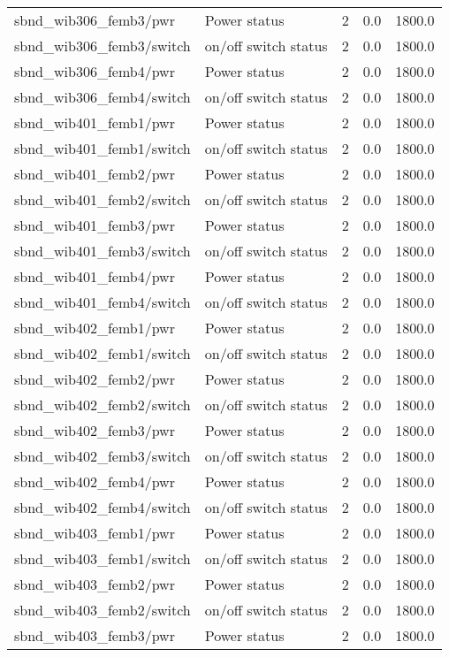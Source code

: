 \begin{center}
\begin{longtable}{l | l l l l }
sbnd\_wib306\_femb3/pwr & Power status & 2 & 0.0 & 1800.0\\ 
sbnd\_wib306\_femb3/switch & on/off switch status & 2 & 0.0 & 1800.0\\ 
sbnd\_wib306\_femb4/pwr & Power status & 2 & 0.0 & 1800.0\\ 
sbnd\_wib306\_femb4/switch & on/off switch status & 2 & 0.0 & 1800.0\\ 
sbnd\_wib401\_femb1/pwr & Power status & 2 & 0.0 & 1800.0\\ 
sbnd\_wib401\_femb1/switch & on/off switch status & 2 & 0.0 & 1800.0\\ 
sbnd\_wib401\_femb2/pwr & Power status & 2 & 0.0 & 1800.0\\ 
sbnd\_wib401\_femb2/switch & on/off switch status & 2 & 0.0 & 1800.0\\ 
sbnd\_wib401\_femb3/pwr & Power status & 2 & 0.0 & 1800.0\\ 
sbnd\_wib401\_femb3/switch & on/off switch status & 2 & 0.0 & 1800.0\\ 
sbnd\_wib401\_femb4/pwr & Power status & 2 & 0.0 & 1800.0\\ 
sbnd\_wib401\_femb4/switch & on/off switch status & 2 & 0.0 & 1800.0\\ 
sbnd\_wib402\_femb1/pwr & Power status & 2 & 0.0 & 1800.0\\ 
sbnd\_wib402\_femb1/switch & on/off switch status & 2 & 0.0 & 1800.0\\ 
sbnd\_wib402\_femb2/pwr & Power status & 2 & 0.0 & 1800.0\\ 
sbnd\_wib402\_femb2/switch & on/off switch status & 2 & 0.0 & 1800.0\\ 
sbnd\_wib402\_femb3/pwr & Power status & 2 & 0.0 & 1800.0\\ 
sbnd\_wib402\_femb3/switch & on/off switch status & 2 & 0.0 & 1800.0\\ 
sbnd\_wib402\_femb4/pwr & Power status & 2 & 0.0 & 1800.0\\ 
sbnd\_wib402\_femb4/switch & on/off switch status & 2 & 0.0 & 1800.0\\ 
sbnd\_wib403\_femb1/pwr & Power status & 2 & 0.0 & 1800.0\\ 
sbnd\_wib403\_femb1/switch & on/off switch status & 2 & 0.0 & 1800.0\\ 
sbnd\_wib403\_femb2/pwr & Power status & 2 & 0.0 & 1800.0\\ 
sbnd\_wib403\_femb2/switch & on/off switch status & 2 & 0.0 & 1800.0\\ 
sbnd\_wib403\_femb3/pwr & Power status & 2 & 0.0 & 1800.0\\ 

\end{longtable}
\end{center}
